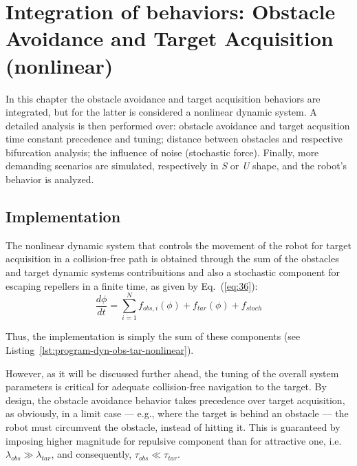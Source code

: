 \renewcommand{\baselinestretch}{1.0}
\chapter{Integration of behaviors: Obstacle Avoidance and Target Acquisition (nonlinear)}%
\label{ch:obstacle-target-nonlinear}
\renewcommand{\baselinestretch}{1.5}
In this chapter the obstacle avoidance and target acquisition behaviors are
integrated, but for the latter is considered a nonlinear dynamic system. A
detailed analysis is then performed over: obstacle avoidance and target
acqusition time constant precedence and tuning; distance between obstacles and
respective bifurcation analysis; the influence of noise (stochastic force). 
Finally, more demanding scenarios are simulated, respectively in \emph{S} or
\emph{U} shape, and the robot's behavior is analyzed.

\section{Implementation}
The nonlinear dynamic system that controls the movement of the robot for target
acquisition in a collision-free path is obtained
through the sum of the obstacles and target dynamic systems contribuitions and
also a stochastic component for escaping repellers in a finite time, as given by Eq.~(\ref{eq:36}):
%
\begin{equation}
\label{eq:36}
 \frac{d \phi}{dt} = \sum_{i = 1}^N{f_{obs,i}(\phi)} + f_{tar}(\phi) + f_{stoch}
\end{equation}

Thus, the implementation is simply the sum of these components (see Listing~\ref{lst:program-dyn-obs-tar-nonlinear}).
%

However, as it will be discussed further ahead, the tuning of the overall system
parameters is critical for adequate collision-free navigation to the target. By
design, the obstacle avoidance behavior takes precedence over target
acquisition, as obviously, in a limit case --- e.g., where the target is behind an
obstacle --- the robot must circumvent the obstacle, instead of hitting it. This
is guaranteed by imposing higher magnitude for repulsive component than for
attractive one, i.e. $\lambda_{obs} \gg \lambda_{tar}$, and consequently,
$\tau_{obs} \ll \tau_{tar}$.

